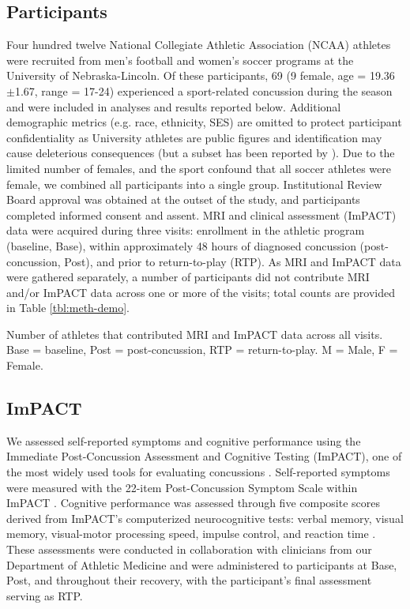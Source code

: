 \documentclass[12pt]{article}
\begin{document}
\subsection{Participants}
\label{ssec:meth-part}
Four hundred twelve National Collegiate Athletic Association (NCAA) athletes were recruited from men's football and women's soccer programs at the University of Nebraska-Lincoln. Of these participants, 69 (9 female, age = 19.36 $\pm$1.67, range = 17-24) experienced a sport-related concussion during the season and were included in analyses and results reported below. Additional demographic metrics (e.g. race, ethnicity, SES) are omitted to protect participant confidentiality as University athletes are public figures and identification may cause deleterious consequences (but a subset has been reported by \cite{bouchard2024ConcussionRelatedDisruptionsHub}). Due to the limited number of females, and the sport confound that all soccer athletes were female, we combined all participants into a single group. Institutional Review Board approval was obtained at the outset of the study, and participants completed informed consent and assent. MRI and clinical assessment (ImPACT) data were acquired during three visits: enrollment in the athletic program (baseline, Base), within approximately 48 hours of diagnosed concussion (post-concussion, Post), and prior to return-to-play (RTP). As MRI and ImPACT data were gathered separately, a number of participants did not contribute MRI and/or ImPACT data across one or more of the visits; total counts are provided in Table \ref{tbl:meth-demo}.

\begin{table}[H]
	\centering
	\scriptsize
	
	\caption{Number of athletes that contributed MRI and ImPACT data across all visits. Base = baseline, Post = post-concussion, RTP = return-to-play. M = Male, F = Female.}
	\label{tbl:meth-demo}
\end{table}


\subsection{ImPACT}
\label{ssec:meth-imp}
We assessed self-reported symptoms and cognitive performance using the Immediate Post-Concussion Assessment and Cognitive Testing (ImPACT), one of the most widely used tools for evaluating concussions \parencite{lovell2005ImPACT200540,dessy2017ReviewAssessmentScales}. Self-reported symptoms were measured with the 22-item Post-Concussion Symptom Scale within ImPACT \parencite{lovell2006MeasurementSymptomsFollowing}. Cognitive performance was assessed through five composite scores derived from ImPACT's computerized neurocognitive tests: verbal memory, visual memory, visual-motor processing speed, impulse control, and reaction time \parencite{lovell2005ImPACT200540}. These assessments were conducted in collaboration with clinicians from our Department of Athletic Medicine and were administered to participants at Base, Post, and throughout their recovery, with the participant's final assessment serving as RTP.
\end{document}
